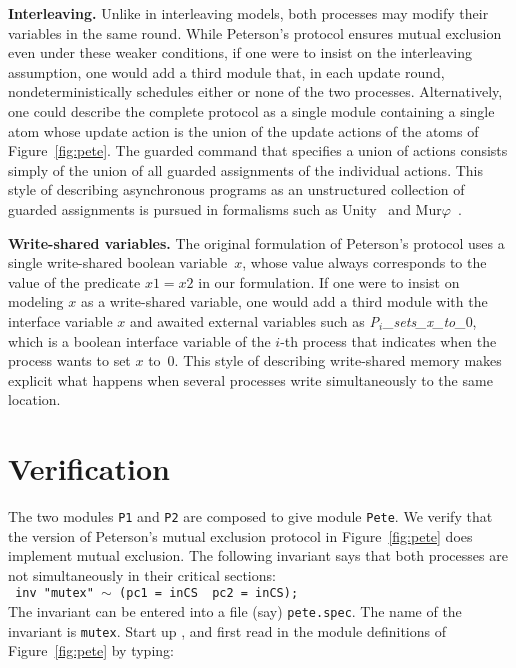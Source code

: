 \mypar
{\bf Interleaving.}
Unlike in interleaving models, both processes may modify their variables in
the same round.
While Peterson's protocol ensures mutual exclusion even under these weaker
conditions, if one were to insist on the interleaving assumption, one would
add a third module that, in each update round, nondeterministically schedules
either or none of the two processes.
Alternatively, one could describe the complete protocol as a single module
containing a single atom whose update action is the union of the update
actions of the atoms of Figure~\ref{fig:pete}.
The guarded command that specifies a union of actions consists simply of the
union of all guarded assignments of the individual actions.
This style of describing asynchronous programs as an unstructured collection
of guarded assignments is pursued in formalisms such as
{\sc Unity}~\cite{ChandyMisra88} and {\sc Mur}$\varphi$~\cite{Dill96}.

\mypar
{\bf Write-shared variables.}
The original formulation of Peterson's protocol uses a single write-shared
boolean variable~$x$, whose value always corresponds to the value of the
predicate $x1=x2$ in our formulation.
If one were to insist on modeling $x$ as a write-shared variable, one would
add a third module with the interface variable $x$ and awaited external
variables such as {\em P$_i$\_sets\_x\_to\_}0, which is a boolean interface
variable of the $i$-th process that indicates when the process wants to set
$x$ to~0.
This style of describing write-shared memory makes explicit what happens when
several processes write simultaneously to the same location.

\section{Verification}
The two modules {\tt P1} and {\tt P2} are composed to give module {\tt Pete}. 
We verify that the version of Peterson's mutual exclusion
protocol in Figure~\ref{fig:pete} does implement mutual exclusion. 
The following invariant says that both processes are not simultaneously in their
critical sections:\\

{\noindent\tt
inv "mutex" $\sim$ (pc1 = inCS \AND\ pc2 = inCS);
}\\

The invariant can be entered into a file (say) {\tt pete.spec}.
The name of the invariant is {\tt mutex}.
Start up \mocha, and first read in the
module definitions of Figure~\ref{fig:pete} by typing:\\

